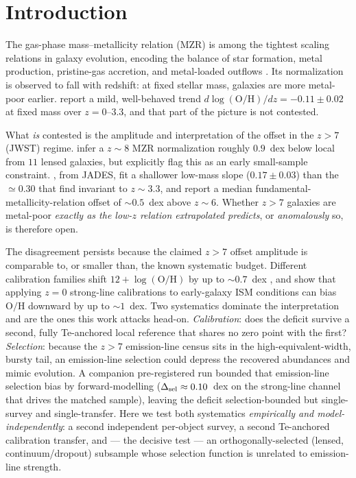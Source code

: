 \documentclass[twocolumn]{aastex631}
\begin{document}
\section{Introduction}
The gas-phase mass--metallicity relation (MZR) is among the tightest scaling relations in galaxy evolution, encoding the balance of star formation, metal production, pristine-gas accretion, and metal-loaded outflows \citep{Tremonti2004,KewleyEllison2008}. Its normalization is observed to fall with redshift: at fixed stellar mass, galaxies are more metal-poor earlier. \citet{Sanders2021} report a mild, well-behaved trend $d\log(\mathrm{O/H})/dz = -0.11\pm0.02$ at fixed mass over $z=0$--$3.3$, and that part of the picture is not contested.

What \emph{is} contested is the amplitude and interpretation of the offset in the $z>7$ (JWST) regime. \citet{Langeroodi2023} infer a $z\sim8$ MZR normalization roughly $0.9$~dex below local from $11$ lensed galaxies, but explicitly flag this as an early small-sample constraint. \citet{Curti2024}, from JADES, fit a shallower low-mass slope ($0.17\pm0.03$) than the $\simeq0.30$ that \citet{Sanders2021} find invariant to $z\sim3.3$, and report a median fundamental-metallicity-relation offset of $\sim0.5$~dex above $z\sim6$. Whether $z>7$ galaxies are metal-poor \emph{exactly as the low-$z$ relation extrapolated predicts}, or \emph{anomalously} so, is therefore open.

The disagreement persists because the claimed $z>7$ offset amplitude is comparable to, or smaller than, the known systematic budget. Different calibration families shift $12+\log(\mathrm{O/H})$ by up to $\sim0.7$~dex \citep{KewleyEllison2008}, and \citet{Hirschmann2023} show that applying $z=0$ strong-line calibrations to early-galaxy ISM conditions can bias $\mathrm{O/H}$ downward by up to $\sim1$~dex. Two systematics dominate the interpretation and are the ones this work attacks head-on. \emph{Calibration}: does the deficit survive a second, fully Te-anchored local reference that shares no zero point with the first? \emph{Selection}: because the $z>7$ emission-line census sits in the high-equivalent-width, bursty tail, an emission-line selection could depress the recovered abundances and mimic evolution. A companion pre-registered run bounded that emission-line selection bias by forward-modelling ($\Delta_{\rm sel}\approx0.10$~dex on the strong-line channel that drives the matched sample), leaving the deficit selection-bounded but single-survey and single-transfer. Here we test both systematics \emph{empirically and model-independently}: a second independent per-object survey, a second Te-anchored calibration transfer, and --- the decisive test --- an orthogonally-selected (lensed, continuum/dropout) subsample whose selection function is unrelated to emission-line strength.
\end{document}
